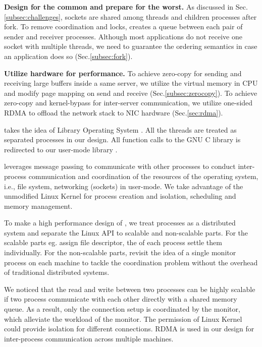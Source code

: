 \textbf{Design for the common and prepare for the worst.}
As discussed in Sec.\ref{subsec:challenges}, sockets are shared among threads and children processes after fork. To remove coordination and locks, \libipc creates a queue between each pair of sender and receiver processes. Although most applications do not receive one socket with multiple threads, we need to guarantee the ordering semantics in case an application does so (Sec.\ref{subsec:fork}).

\textbf{Utilize hardware for performance.}
To achieve zero-copy for sending and receiving large buffers inside a same server, we utilize the virtual memory in CPU and modify page mapping on send and receive (Sec.\ref{subsec:zerocopy}). To achieve zero-copy and kernel-bypass for inter-server communication, we utilize one-sided RDMA to offload the network stack to NIC hardware (Sec.\ref{sec:rdma}).


\sys takes the idea of Library Operating System . All the threads are treated as separated processes in our design. All function calls to the GNU C library is redirected to our user-mode library \libipc.

\libipc leverages message passing to communicate with other processes to conduct inter-process communication and coordination of the resources of the operating system, i.e., file system, networking (sockets) in user-mode. We take advantage of the unmodified Linux Kernel for process creation and isolation, scheduling and memory management.

To make a high performance design of \libipc, we treat processes as a distributed system and separate the Linux API to scalable and non-scalable parts. For the scalable parts eg. assign file descriptor, the \libipc of each process settle them individually. For the non-scalable parts, \libipc revisit the idea of a single monitor process on each machine to tackle the coordination problem without the overhead of traditional distributed systems.

We noticed that the read and write between two processes can be highly scalable if two process communicate with each other directly with a shared memory queue. As a result, only the connection setup is coordinated by the monitor, which alleviate the workload of the monitor. The permission of Linux Kernel could provide isolation for different connections. RDMA is used in our design for inter-process communication across multiple machines.

